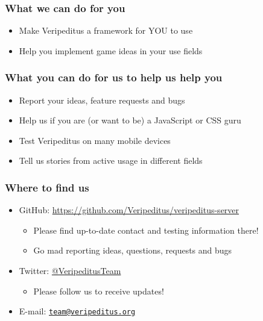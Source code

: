 \documentclass[aspectratio=43]{beamer}
\begin{document}
 \begin{frame}
  \frametitle{What we can do for you}

  \begin{itemize}
   \item{Make Veripeditus a framework for YOU to use}
   \item{Help you implement game ideas in your use fields}
  \end{itemize}
 \end{frame}


 \begin{frame}
  \frametitle{What you can do for us to help us help you}

  \begin{itemize}
   \item{Report your ideas, feature requests and bugs}
   \item{Help us if you are (or want to be) a JavaScript or CSS guru}
   \item{Test Veripeditus on many mobile devices}
   \item{Tell us stories from active usage in different fields}
  \end{itemize}
 \end{frame}


 \begin{frame}
  \frametitle{Where to find us}

  \begin{itemize}
   \item{GitHub: \url{https://github.com/Veripeditus/veripeditus-server}
    \begin{itemize}
     \item{Please find up-to-date contact and testing information there!}
     \item{Go mad reporting ideas, questions, requests and bugs}
    \end{itemize}
   }
   \item{Twitter: \href{https://www.twitter.com/VeripeditusTeam}{@VeripeditusTeam}
    \begin{itemize}
     \item{Please follow us to receive updates!}
    \end{itemize}
   }
   \item{E-mail: \href{mailto:team@veripeditus.org}{\nolinkurl{team@veripeditus.org}} }
  \end{itemize}
 \end{frame}
\end{document}
